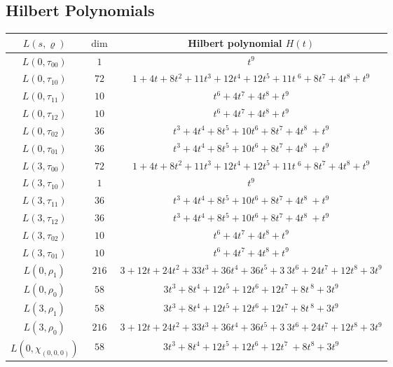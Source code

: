 \subsection{Hilbert Polynomials}

\begin{center}
\begin{tabular}{c|c|c}
\hline
$L(s,\varrho)$ & $\dim$ & Hilbert polynomial $H(t)$ \\
\hline
$L(0,\tau_{00})$ & $1$ & $t^{9}$ \\
$L(0,\tau_{10})$ & $72$ & $1 + 4t + 8t^{2} + 11t^{3} + 12t^{4} + 12t^{5} + 11t\
^{6} + 8t^{7} + 4t^{8} + t^{9}$ \\
$L(0,\tau_{11})$ & $10$ & $t^{6} + 4t^{7} + 4t^{8} + t^{9}$ \\
$L(0,\tau_{12})$ & $10$ & $t^{6} + 4t^{7} + 4t^{8} + t^{9}$ \\
$L(0,\tau_{02})$ & $36$ & $t^{3} + 4t^{4} + 8t^{5} + 10t^{6} + 8t^{7} + 4t^{8}\
 + t^{9}$ \\
$L(0,\tau_{01})$ & $36$ & $t^{3} + 4t^{4} + 8t^{5} + 10t^{6} + 8t^{7} + 4t^{8}\
 + t^{9}$ \\
$L(3,\tau_{00})$ & $72$ & $1 + 4t + 8t^{2} + 11t^{3} + 12t^{4} + 12t^{5} + 11t\
^{6} + 8t^{7} + 4t^{8} + t^{9}$ \\
$L(3,\tau_{10})$ & $1$ & $t^{9}$ \\
$L(3,\tau_{11})$ & $36$ & $t^{3} + 4t^{4} + 8t^{5} + 10t^{6} + 8t^{7} + 4t^{8}\
 + t^{9}$ \\
$L(3,\tau_{12})$ & $36$ & $t^{3} + 4t^{4} + 8t^{5} + 10t^{6} + 8t^{7} + 4t^{8}\
 + t^{9}$ \\
$L(3,\tau_{02})$ & $10$ & $t^{6} + 4t^{7} + 4t^{8} + t^{9}$ \\
$L(3,\tau_{01})$ & $10$ & $t^{6} + 4t^{7} + 4t^{8} + t^{9}$ \\
$L(0,\rho_{1})$ & $216$ & $3 + 12t + 24t^{2} + 33t^{3} + 36t^{4} + 36t^{5} + 3\
3t^{6} + 24t^{7} + 12t^{8} + 3t^{9}$ \\
$L(0,\rho_{0})$ & $58$ & $3t^{3} + 8t^{4} + 12t^{5} + 12t^{6} + 12t^{7} + 8t^{\
8} + 3t^{9}$ \\
$L(3,\rho_{1})$ & $58$ & $3t^{3} + 8t^{4} + 12t^{5} + 12t^{6} + 12t^{7} + 8t^{\
8} + 3t^{9}$ \\
$L(3,\rho_{0})$ & $216$ & $3 + 12t + 24t^{2} + 33t^{3} + 36t^{4} + 36t^{5} + 3\
3t^{6} + 24t^{7} + 12t^{8} + 3t^{9}$ \\
$L(0,\chi_{(0,0,0)})$ & $58$ & $3t^{3} + 8t^{4} + 12t^{5} + 12t^{6} + 12t^{7} \
+ 8t^{8} + 3t^{9}$ \\

\end{tabular}
\end{center}
